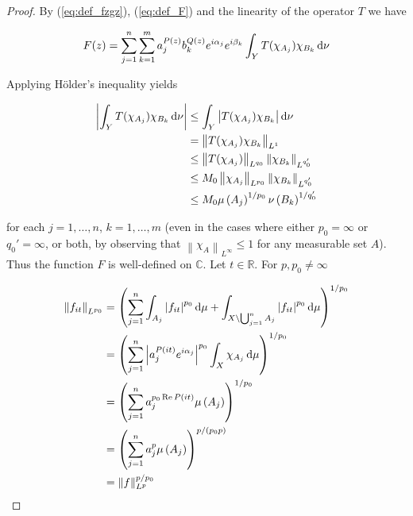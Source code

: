 \begin{proof}
By (\ref{eq:def_fzgz}), (\ref{eq:def_F}) and the linearity of the operator $T$ we have

\begin{gather*}
	F(z) = \sum_{j = 1}^n\sum_{k = 1}^m a^{P(z)}_j b_k^{Q(z)} e^{i\alpha_j} e^{i\beta_k} \int_YT(\chi_{A_j})\chi_{B_k}\mathop{}\!\mathrm{d}\nu
\end{gather*}

Applying H\"older's inequality yields

\begin{gather}
	\begin{aligned}
		\left| \int_YT(\chi_{A_j})\chi_{B_k}\mathop{}\!\mathrm{d}\nu \right| &\leq \int_Y\left| T(\chi_{A_j})\chi_{B_k}\right|\mathop{}\!\mathrm{d}\nu\\
		&= \left\|T(\chi_{A_j})\chi_{B_k}\right\|_{L^1}\\
		&\leq \left\|T(\chi_{A_j})\right\|_{L^{q_0}} \left\|\chi_{B_k}\right\|_{L^{q_0'}}\\
		&\leq M_0\left\|\chi_{A_j}\right\|_{L^{p_0}} \left\|\chi_{B_k}\right\|_{L^{q_0'}}\\
		&\leq M_0 \mu\left(A_j\right)^{1/p_0}\nu\left(B_k\right)^{1/q_0'}
	\end{aligned}
	\label{est:constant_F}
\end{gather}

\noindent for each $j = 1,\hdots,n$, $k = 1,\hdots,m$ (even in the cases where either $p_0 = \infty$ or $q_0' = \infty$, or both, by observing that $\left\| \chi_{A}\right\|_{L^\infty} \leq 1$ for any measurable set $A$). Thus the function $F$ is well-defined on $\mathbb{C}$. Let $t \in \mathbb{R}$. For $p,p_0 \neq \infty$

\begin{gather*}
	\begin{aligned}
		\left\|f_{it}\right\|_{L^{p_0}} &= \left(\sum_{j = 1}^n \int_{A_j} \left| f_{it} \right|^{p_0} \mathop{}\!\mathrm{d}\mu + \int_{X \setminus \bigcup_{j = 1}^n A_j} \left| f_{it} \right|^{p_0} \mathop{}\!\mathrm{d}\mu\right)^{1/p_0}\\
		&= \left(\sum_{j = 1}^n \left| a_j^{P(it)} e^{i\alpha_j}\right|^{p_0}\int_X \chi_{A_j} \mathop{}\!\mathrm{d}\mu\right)^{1/p_0}\\
		&= \left(\sum_{j = 1}^n a_j^{p_0\operatorname{Re} P(it)}\mu\left(A_j\right)\right)^{1/p_0}\\
		&= \left(\sum_{j = 1}^n a_j^p\mu\left(A_j\right)\right)^{p/\left(p_0p\right)}\\
		&= \left\|f\right\|_{L^p}^{p/p_0} 
	\end{aligned}
\end{gather*}


\end{proof}
